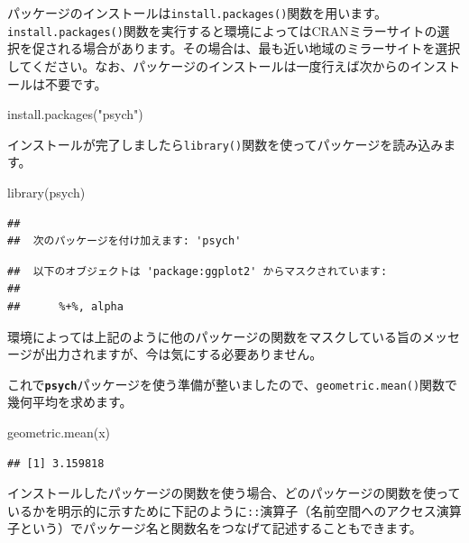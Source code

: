 \documentclass[
  12pt,
]{book}
\newenvironment{Shaded}{\begin{snugshade}}{\end{snugshade}}
\newcommand{\FunctionTok}[1]{\textcolor[rgb]{0.00,0.00,0.00}{#1}}
\newcommand{\NormalTok}[1]{#1}
\newcommand{\StringTok}[1]{\textcolor[rgb]{0.31,0.60,0.02}{#1}}
\begin{document}
パッケージのインストールは\texttt{install.packages()}関数を用います。\texttt{install.packages()}関数を実行すると環境によってはCRANミラーサイトの選択を促される場合があります。その場合は、最も近い地域のミラーサイトを選択してください。なお、パッケージのインストールは一度行えば次からのインストールは不要です。

\begin{Shaded}
\begin{Highlighting}[]
\FunctionTok{install.packages}\NormalTok{(}\StringTok{"psych"}\NormalTok{)}
\end{Highlighting}
\end{Shaded}

インストールが完了しましたら\texttt{library()}関数を使ってパッケージを読み込みます。

\begin{Shaded}
\begin{Highlighting}[]
\FunctionTok{library}\NormalTok{(psych)}
\end{Highlighting}
\end{Shaded}

\begin{verbatim}
## 
##  次のパッケージを付け加えます: 'psych'
\end{verbatim}

\begin{verbatim}
##  以下のオブジェクトは 'package:ggplot2' からマスクされています: 
## 
##      %+%, alpha
\end{verbatim}

環境によっては上記のように他のパッケージの関数をマスクしている旨のメッセージが出力されますが、今は気にする必要ありません。

これで\textbf{\texttt{psych}}パッケージを使う準備が整いましたので、\texttt{geometric.mean()}関数で幾何平均を求めます。

\begin{Shaded}
\begin{Highlighting}[]
\FunctionTok{geometric.mean}\NormalTok{(x)}
\end{Highlighting}
\end{Shaded}

\begin{verbatim}
## [1] 3.159818
\end{verbatim}

インストールしたパッケージの関数を使う場合、どのパッケージの関数を使っているかを明示的に示すために下記のように\texttt{::}演算子（名前空間へのアクセス演算子という）でパッケージ名と関数名をつなげて記述することもできます。
\end{document}
